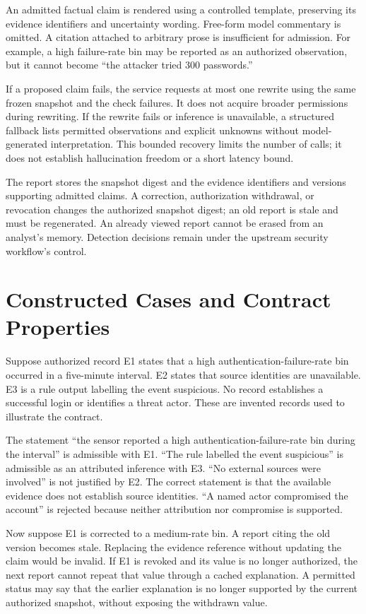 An admitted factual claim is rendered using a controlled template, preserving its evidence identifiers and uncertainty wording. Free-form model commentary is omitted. A citation attached to arbitrary prose is insufficient for admission. For example, a high failure-rate bin may be reported as an authorized observation, but it cannot become ``the attacker tried 300 passwords.''

If a proposed claim fails, the service requests at most one rewrite using the same frozen snapshot and the check failures. It does not acquire broader permissions during rewriting. If the rewrite fails or inference is unavailable, a structured fallback lists permitted observations and explicit unknowns without model-generated interpretation. This bounded recovery limits the number of calls; it does not establish hallucination freedom or a short latency bound.

The report stores the snapshot digest and the evidence identifiers and versions supporting admitted claims. A correction, authorization withdrawal, or revocation changes the authorized snapshot digest; an old report is stale and must be regenerated. An already viewed report cannot be erased from an analyst's memory. Detection decisions remain under the upstream security workflow's control.

\section{Constructed Cases and Contract Properties}
Suppose authorized record E1 states that a high authentication-failure-rate bin occurred in a five-minute interval. E2 states that source identities are unavailable. E3 is a rule output labelling the event suspicious. No record establishes a successful login or identifies a threat actor. These are invented records used to illustrate the contract.

The statement ``the sensor reported a high authentication-failure-rate bin during the interval'' is admissible with E1. ``The rule labelled the event suspicious'' is admissible as an attributed inference with E3. ``No external sources were involved'' is not justified by E2. The correct statement is that the available evidence does not establish source identities. ``A named actor compromised the account'' is rejected because neither attribution nor compromise is supported.

Now suppose E1 is corrected to a medium-rate bin. A report citing the old version becomes stale. Replacing the evidence reference without updating the claim would be invalid. If E1 is revoked and its value is no longer authorized, the next report cannot repeat that value through a cached explanation. A permitted status may say that the earlier explanation is no longer supported by the current authorized snapshot, without exposing the withdrawn value.


